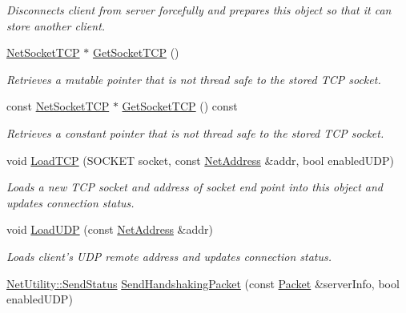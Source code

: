 \begin{DoxyCompactItemize}
\begin{DoxyCompactList}\small\item\em Disconnects client from server forcefully and prepares this object so that it can store another client. \item\end{DoxyCompactList}\item 
\hyperlink{class_net_socket_t_c_p}{NetSocketTCP} $\ast$ \hyperlink{class_net_server_client_a5a2146b933f1dd06937ac33e3cc9df56}{GetSocketTCP} ()
\begin{DoxyCompactList}\small\item\em Retrieves a mutable pointer that is not thread safe to the stored TCP socket. \item\end{DoxyCompactList}\item 
const \hyperlink{class_net_socket_t_c_p}{NetSocketTCP} $\ast$ \hyperlink{class_net_server_client_abd708f991967944a42a120af05b10693}{GetSocketTCP} () const 
\begin{DoxyCompactList}\small\item\em Retrieves a constant pointer that is not thread safe to the stored TCP socket. \item\end{DoxyCompactList}\item 
void \hyperlink{class_net_server_client_a8e4e998ff810c522f54cd92a25a7bfe6}{LoadTCP} (SOCKET socket, const \hyperlink{class_net_address}{NetAddress} \&addr, bool enabledUDP)
\begin{DoxyCompactList}\small\item\em Loads a new TCP socket and address of socket end point into this object and updates connection status. \item\end{DoxyCompactList}\item 
void \hyperlink{class_net_server_client_aa8ed5a905dcba6c9bf260e96ccedd969}{LoadUDP} (const \hyperlink{class_net_address}{NetAddress} \&addr)
\begin{DoxyCompactList}\small\item\em Loads client's UDP remote address and updates connection status. \item\end{DoxyCompactList}\item 
\hyperlink{class_net_utility_a8051eca61204ffd818281419bbf44736}{NetUtility::SendStatus} \hyperlink{class_net_server_client_a8775cd76292b26ee36962bec02f4591f}{SendHandshakingPacket} (const \hyperlink{class_packet}{Packet} \&serverInfo, bool enabledUDP)

\end{DoxyCompactItemize}
